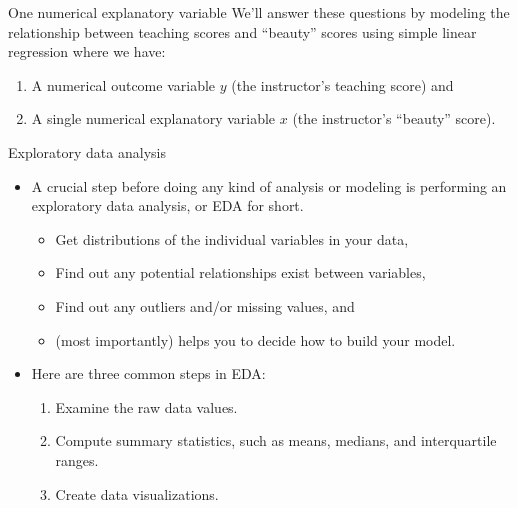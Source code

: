 \documentclass[
  ignorenonframetext,
]{beamer}
\providecommand{\tightlist}{%
  \setlength{\itemsep}{0pt}\setlength{\parskip}{0pt}}
\begin{document}
\begin{frame}{One numerical explanatory variable}
\label{one-numerical-explanatory-variable-2}
We'll answer these questions by modeling the relationship between
teaching scores and ``beauty'' scores using simple linear regression
where we have:

\begin{enumerate}
\item
  A numerical outcome variable \(y\) (the instructor's teaching score)
  and
\item
  A single numerical explanatory variable \(x\) (the instructor's
  ``beauty'' score).
\end{enumerate}
\end{frame}

\begin{frame}{Exploratory data analysis}
\label{exploratory-data-analysis}
\begin{itemize}
\item
  A crucial step before doing any kind of analysis or modeling is
  performing an exploratory data analysis, or EDA for short.

  \begin{itemize}
  \tightlist
  \item
    Get distributions of the individual variables in your data,
  \item
    Find out any potential relationships exist between variables,
  \item
    Find out any outliers and/or missing values, and
  \item
    (most importantly) helps you to decide how to build your model.
  \end{itemize}
\item
  Here are three common steps in EDA:

  \begin{enumerate}
  \tightlist
  \item
    Examine the raw data values.
  \item
    Compute summary statistics, such as means, medians, and
    interquartile ranges.
  \item
    Create data visualizations.
  \end{enumerate}
\end{itemize}
\end{frame}
\end{document}
